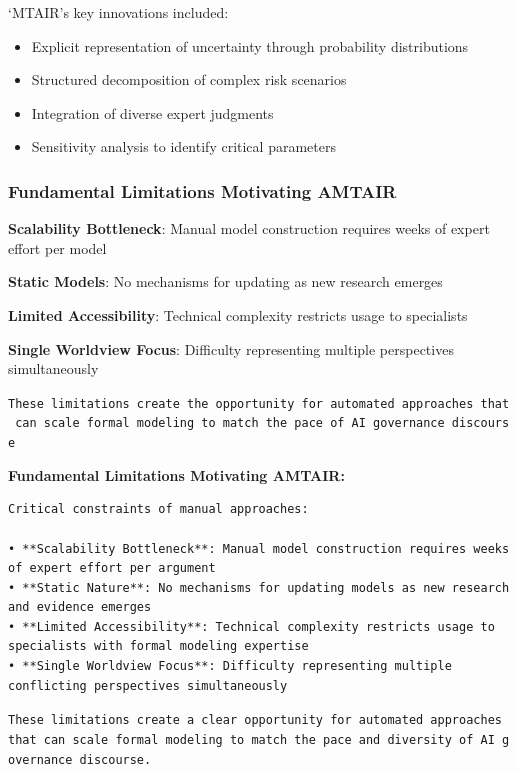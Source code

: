 \documentclass[
  11pt,
  letterpaper,
]{book}
\providecommand{\tightlist}{%
  \setlength{\itemsep}{0pt}\setlength{\parskip}{0pt}}
\begin{document}
`MTAIR's key innovations included:

\begin{itemize}
\tightlist
\item
  Explicit representation of uncertainty through probability
  distributions
\item
  Structured decomposition of complex risk scenarios
\item
  Integration of diverse expert judgments
\item
  Sensitivity analysis to identify critical parameters
\end{itemize}

\subsubsection{Fundamental Limitations Motivating
AMTAIR}\label{sec-mtair-limitations}

\textbf{Scalability Bottleneck}: Manual model construction requires
weeks of expert effort per model

\textbf{Static Models}: No mechanisms for updating as new research
emerges

\textbf{Limited Accessibility}: Technical complexity restricts usage to
specialists

\textbf{Single Worldview Focus}: Difficulty representing multiple
perspectives simultaneously

\texttt{These\ limitations\ create\ the\ opportunity\ for\ automated\ approaches\ that\ can\ scale\ formal\ modeling\ to\ match\ the\ pace\ of\ AI\ governance\ discourse}

\textbf{Fundamental Limitations Motivating AMTAIR:}

\begin{verbatim}
Critical constraints of manual approaches:

• **Scalability Bottleneck**: Manual model construction requires weeks of expert effort per argument
• **Static Nature**: No mechanisms for updating models as new research and evidence emerges  
• **Limited Accessibility**: Technical complexity restricts usage to specialists with formal modeling expertise
• **Single Worldview Focus**: Difficulty representing multiple conflicting perspectives simultaneously
\end{verbatim}

\texttt{These\ limitations\ create\ a\ clear\ opportunity\ for\ automated\ approaches\ that\ can\ scale\ formal\ modeling\ to\ match\ the\ pace\ and\ diversity\ of\ AI\ governance\ discourse.}
\end{document}
